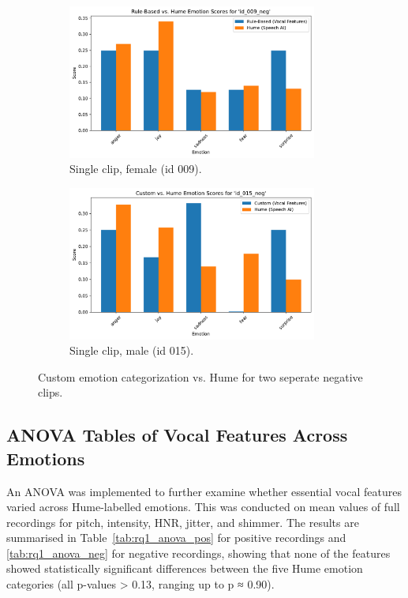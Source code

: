 \begin{figure}[H]
    \centering
    \begin{subfigure}[t]{0.45\textwidth}
        \centering
        \includegraphics[width=0.9\textwidth]{png/results/rq1_nr3/id_009_neg_praat_hume_comparison.pdf}
        \caption{Single clip, female (id 009).}
        \label{fig:praat_hume_009_neg}
    \end{subfigure} 
    \begin{subfigure}[t]{0.45\textwidth}
        \centering
        \includegraphics[width=0.9\textwidth]{png/results/rq1_nr3/id_015_neg_praat_hume_comparison.pdf}
        \caption{Single clip, male (id 015).}
        \label{fig:praat_hume_015_neg}
    \end{subfigure} 
    \caption{Custom emotion categorization vs. Hume for two seperate negative clips.}
    \label{fig:rq1_praat_hume_neg}
\end{figure}


\subsection{ANOVA Tables of Vocal Features Across Emotions}
An ANOVA was implemented to further examine whether essential vocal features varied across Hume-labelled emotions. This was conducted on mean values of full recordings for pitch, intensity, HNR, jitter, and shimmer. 
The results are summarised in Table~\ref{tab:rq1_anova_pos} for positive recordings and \ref{tab:rq1_anova_neg} for negative recordings, 
showing that none of the features showed statistically significant differences between the five Hume emotion categories (all p-values > 0.13, ranging up to p ≈ 0.90). 

